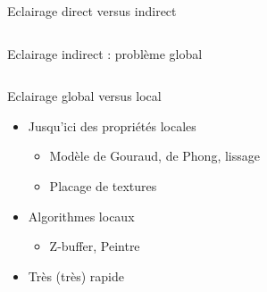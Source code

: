 \begin{frame}{Eclairage direct versus indirect}
\begin{columns}
\begin{column}{0.49\textwidth}
\begin{center}
                Eclairage indirect : problème global
            \end{center}
        \end{column}
    \end{columns}
\end{frame}

\begin{frame}{Eclairage global versus local}
\begin{itemize}
    \item Jusqu'ici des propriétés locales 
    \begin{itemize}
        \item Modèle de Gouraud, de Phong, lissage 
        \item Placage de textures 
    \end{itemize}
    \item Algorithmes locaux
    \begin{itemize}
        \item Z-buffer, Peintre
    \end{itemize}
    \item Très (très) rapide 
\end{itemize}    
\end{frame}

